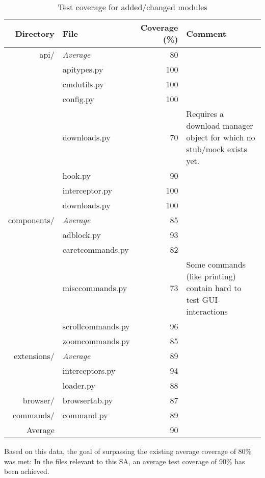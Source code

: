\begingroup
\renewcommand{\arraystretch}{1}
\begin{table}[H]
  \centering
  \begin{tabulary}{\linewidth}{rlrL}
    \toprule
    Directory & File & Coverage (\%) & Comment \\
    \midrule
    api/ & \emph{Average} & 80 & \\
    & apitypes.py & 100 & \\
    & cmdutils.py & 100 & \\
    & config.py & 100 & \\
    & downloads.py & 70 & Requires a download manager object for which no
                          stub/mock exists yet. \\
    & hook.py & 90 & \\
    & interceptor.py & 100 & \\
    & downloads.py & 100 & \strut\vspace{1em} \\
    components/ & \emph{Average} & 85 & \\
    & adblock.py & 93 & \\
    & caretcommands.py & 82 & \\
    & misccommands.py & 73 & Some commands (like printing) contain
                             hard to test GUI-interactions \\
    & scrollcommands.py & 96 & \\
    & zoomcommands.py & 85 & \strut\vspace{1em} \\
    extensions/ & \emph{Average} & 89 & \\
    & interceptors.py & 94 & \\
    & loader.py & 88 & \strut\vspace{1em} \\
    browser/ & browsertab.py & 87 & \\
    commands/ & command.py & 89 & \\
    \midrule
    Average & & 90 & \\
    \bottomrule
  \end{tabulary}
  \caption{Test coverage for added/changed modules}
  \label{tab:coverage}
\end{table}
\endgroup

Based on this data, the goal of surpassing the existing average coverage of 80\%
was met: In the files relevant to this SA, an average test coverage of 90\% has
been achieved.

